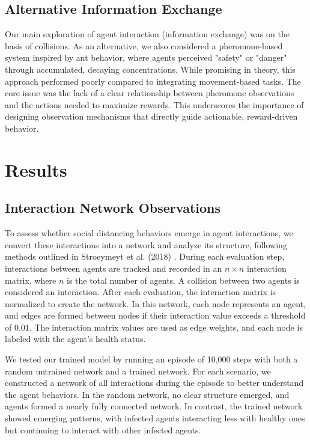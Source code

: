 \documentclass[9pt]{IEEEtran}
\begin{document}
\subsection{Alternative Information Exchange}

Our main exploration of agent interaction (information exchange) was on the basis of collisions. As an alternative, we also considered a pheromone-based system inspired by ant behavior, where agents perceived "safety" or "danger" through accumulated, decaying concentrations. While promising in theory, this approach performed poorly compared to integrating movement-based tasks. The core issue was the lack of a clear relationship between pheromone observations and the actions needed to maximize rewards. This underscores the importance of designing observation mechanisms that directly guide actionable, reward-driven behavior.

\section{Results}

\subsection{Interaction Network Observations}

To assess whether social distancing behaviors emerge in agent interactions, we convert these interactions into a network and analyze its structure, following methods outlined in Stroeymeyt et al. (2018) \cite{Stroeymeyt2018}. During each evaluation step, interactions between agents are tracked and recorded in an $n \times n$ interaction matrix, where $n$ is the total number of agents. A collision between two agents is considered an interaction. After each evaluation, the interaction matrix is normalized to create the network. In this network, each node represents an agent, and edges are formed between nodes if their interaction value exceeds a threshold of 0.01. The interaction matrix values are used as edge weights, and each node is labeled with the agent's health status.

We tested our trained model by running an episode of 10,000 steps with both a random untrained network and a trained network. For each scenario, we constructed a network of all interactions during the episode to better understand the agent behaviors. In the random network, no clear structure emerged, and agents formed a nearly fully connected network. In contrast, the trained network showed emerging patterns, with infected agents interacting less with healthy ones but continuing to interact with other infected agents. 
\end{document}
